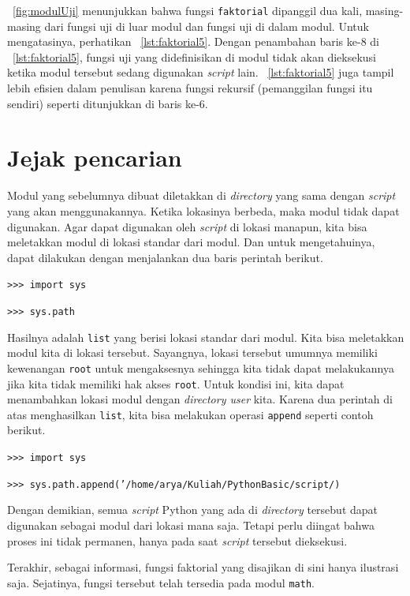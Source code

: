 \figurename~\ref{fig:modulUji} menunjukkan bahwa fungsi \texttt{faktorial} dipanggil dua kali, masing-masing dari fungsi uji di luar modul dan fungsi uji di dalam modul. Untuk mengatasinya, perhatikan \lstlistingname~\ref{lst:faktorial5}. Dengan penambahan baris ke-8 di \lstlistingname~\ref{lst:faktorial5}, fungsi uji yang didefinisikan di modul tidak akan dieksekusi ketika modul tersebut sedang digunakan \textit{script} lain. \lstlistingname~\ref{lst:faktorial5} juga tampil lebih efisien dalam penulisan karena fungsi rekursif (pemanggilan fungsi itu sendiri) seperti ditunjukkan di baris ke-6.



\section{Jejak pencarian}
Modul yang sebelumnya dibuat diletakkan di \textit{directory} yang sama dengan \textit{script} yang akan menggunakannya. Ketika lokasinya berbeda, maka modul tidak dapat digunakan. Agar dapat digunakan oleh \textit{script} di lokasi manapun, kita bisa meletakkan modul di lokasi standar dari modul. Dan untuk mengetahuinya, dapat dilakukan dengan menjalankan dua baris perintah berikut.

\texttt{>>> import sys}

\texttt{>>> sys.path}

Hasilnya adalah \texttt{list} yang berisi lokasi standar dari modul. Kita bisa meletakkan modul kita di lokasi tersebut. Sayangnya, lokasi tersebut umumnya memiliki kewenangan \texttt{root} untuk mengaksesnya sehingga kita tidak dapat melakukannya jika kita tidak memiliki hak akses \texttt{root}. Untuk kondisi ini, kita dapat menambahkan lokasi modul dengan \textit{directory user} kita. Karena dua perintah di atas menghasilkan \texttt{list}, kita bisa melakukan operasi \texttt{append} seperti contoh berikut.

\texttt{>>> import sys}

\texttt{>>> sys.path.append('/home/arya/Kuliah/PythonBasic/script/)}

Dengan demikian, semua \textit{script} Python yang ada di \textit{directory} tersebut dapat digunakan sebagai modul dari lokasi mana saja. Tetapi perlu diingat bahwa proses ini tidak permanen, hanya pada saat \textit{script} tersebut dieksekusi.

Terakhir, sebagai informasi, fungsi faktorial yang disajikan di sini hanya ilustrasi saja. Sejatinya, fungsi tersebut telah tersedia pada modul \texttt{math}.
